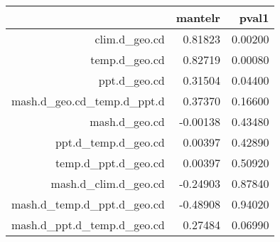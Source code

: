 \begin{table}[ht]
\centering
\begin{tabular}{rrr}
  \hline
 & mantelr & pval1 \\ 
  \hline
clim.d\_geo.cd & 0.81823 & 0.00200 \\ 
  temp.d\_geo.cd & 0.82719 & 0.00080 \\ 
  ppt.d\_geo.cd & 0.31504 & 0.04400 \\ 
  mash.d\_geo.cd\_temp.d\_ppt.d & 0.37370 & 0.16600 \\ 
  mash.d\_geo.cd & -0.00138 & 0.43480 \\ 
  ppt.d\_temp.d\_geo.cd & 0.00397 & 0.42890 \\ 
  temp.d\_ppt.d\_geo.cd & 0.00397 & 0.50920 \\ 
  mash.d\_clim.d\_geo.cd & -0.24903 & 0.87840 \\ 
  mash.d\_temp.d\_ppt.d\_geo.cd & -0.48908 & 0.94020 \\ 
  mash.d\_ppt.d\_temp.d\_geo.cd & 0.27484 & 0.06990 \\ 
   \hline
\end{tabular}
\end{table}
